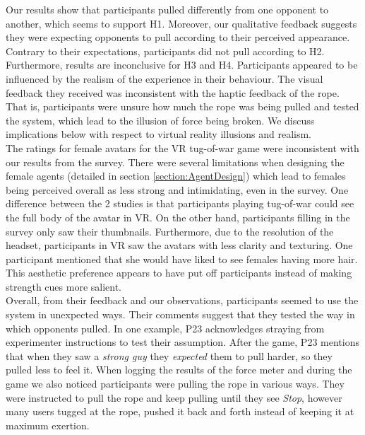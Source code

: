 Our results show that participants pulled differently from one opponent to another, which seems to support H1. Moreover, our qualitative feedback suggests they were expecting opponents to pull according to their perceived appearance. Contrary to their expectations, participants did not pull according to H2. Furthermore, results are inconclusive for H3 and H4. Participants appeared to be influenced by the realism of the experience in their behaviour. The visual feedback they received was inconsistent with the haptic feedback of the rope. That is, participants were unsure how much the rope was being pulled and tested the system, which lead to the illusion of force being broken. We discuss implications below with respect to virtual reality illusions and realism.
\\
The ratings for female avatars for the VR tug-of-war game were inconsistent with our results from the survey. There were several limitations when designing the female agents (detailed in section \ref{section:AgentDesign}) which lead to females being perceived overall as less strong and intimidating, even in the survey. One difference between the 2 studies is that participants playing tug-of-war could see the full body of the avatar in VR. On the other hand, participants filling in the survey only saw their thumbnails. Furthermore, due to the resolution of the headset, participants in VR saw the avatars with less clarity and texturing. One participant mentioned that she would have liked to see females having more hair. This aesthetic preference appears to have put off participants instead of making strength cues more salient.
\\
Overall, from their feedback and our observations, participants seemed to use the system in unexpected ways. Their comments 
suggest that they tested the way in which opponents pulled. In one example, P23 acknowledges straying from experimenter instructions to test their assumption. After the game, P23 mentions that when they saw a \textit{strong guy} they \textit{expected} them to pull harder, so they pulled less to feel it. When logging the results of the force meter and during the game we also noticed participants were pulling the rope in various ways. They were instructed to pull the rope and keep pulling until they see \textit{Stop}, however many  users tugged at the rope, pushed it back and forth instead of keeping it at maximum exertion.\\
